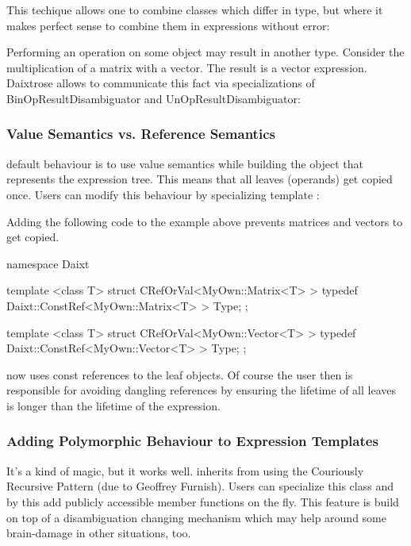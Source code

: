 This techique allows one to combine classes 
which differ in type, but where it makes perfect sense to combine them in
expressions without error:


Performing an operation on some object may result in another type. Consider the
multiplication of a matrix with a vector. The result is a vector expression.
Daixtrose allows to communicate this fact via specializations of
BinOpResultDisambiguator and UnOpResultDisambiguator:


\subsubsection{Value Semantics vs. Reference Semantics}

\Daixtrose default behaviour is to use value semantics while building the object
that represents the expression tree. This means that all leaves (operands) get
copied once. Users can modify this behaviour by specializing
template :

Adding the following code to the example above prevents matrices and vectors to
get copied.  
\begin{code}
namespace Daixt 
{

template <class T>
struct CRefOrVal<MyOwn::Matrix<T> > 
{
  typedef Daixt::ConstRef<MyOwn::Matrix<T> > Type;
};

template <class T>
struct CRefOrVal<MyOwn::Vector<T> > 
{
  typedef Daixt::ConstRef<MyOwn::Vector<T> > Type;
};

}
\end{code}

\Daixtrose now uses const references to the leaf objects. Of course
the user then is responsible for avoiding dangling references by ensuring
the lifetime of all leaves is longer than the lifetime of the expression.


\subsubsection{Adding Polymorphic Behaviour to Expression Templates}

It's a kind of magic, but it works well.
 inherits from  using
the Couriously Recursive Pattern (due to Geoffrey Furnish). Users can specialize
this class and by this add publicly accessible member functions on the fly.
This feature is build on top of a disambiguation changing mechanism
which may help around some brain-damage in other situations, too.

